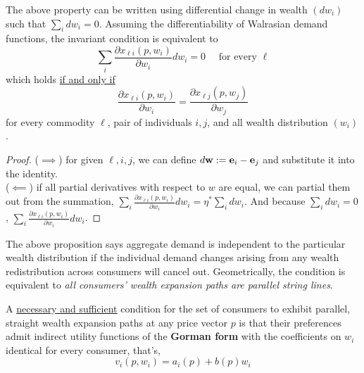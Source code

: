 \documentclass{article}
\begin{document}
	 		\begin{proposition}
	 			The above property can be written using differential change in wealth $(d w_i)$ such that $\sum_i d w_i = 0$. Assuming the differentiability of Walrasian demand functions, the invariant condition is equivalent to 
	 			\begin{equation}
	 				\sum_{i} \frac{\partial x_{\ell i}\left(p, w_{i}\right)}{\partial w_{i}} d w_{i}=0 \quad \text { for every } \ell
	 			\end{equation}
	 			which holds \ul{if and only if}
	 			\begin{equation}
	 				\frac{\partial x_{\ell i}\left(p, w_{i}\right)}{\partial w_{i}}=\frac{\partial x_{\ell j}\left(p, w_{j}\right)}{\partial w_{j}}
	 			\end{equation}
	 			for every commodity $\ell$, pair of individuals $i, j$, and all wealth distribution $(w_i)$.
	 		\end{proposition}
	 		
	 		\begin{proof}
	 			($\implies$) for given $\ell, i, j$, we can define $d\textbf{w} := \textbf{e}_i - \textbf{e}_j$ and substitute it into the identity. \\
	 			($\impliedby$) if all partial derivatives with respect to $w$ are equal, we can partial them out from the summation, $\sum_{i} \frac{\partial x_{\ell i}\left(p, w_{i}\right)}{\partial w_{i}} d w_{i} = \eta^* \sum_i dw_i$. And because $\sum_i dw_i = 0$, $\sum_{i} \frac{\partial x_{\ell i}\left(p, w_{i}\right)}{\partial w_{i}} d w_{i}$.
	 		\end{proof}
	 		
	 		\begin{remark}
	 			The above proposition says aggregate demand is independent to the particular wealth distribution if the individual demand changes arising from any wealth redistribution across consumers will cancel out. Geometrically, the condition is equivalent to \emph{all consumers' wealth expansion paths are parallel string lines}.
	 		\end{remark}
	 		
	 		\begin{proposition}[4.B.1]
	 			A \ul{necessary and sufficient} condition for the set of consumers to exhibit parallel, straight wealth expansion paths at any price vector $p$ is that their preferences admit indirect utility functions of the \textbf{Gorman form} with the coefficients on $w_i$ identical for every consumer, that's,
	 			\begin{equation}
	 				v_{i}\left(p, w_{i}\right)=a_{i}(p)+b(p) w_{i}
	 			\end{equation}
	 		\end{proposition}
	 		
\end{document}
